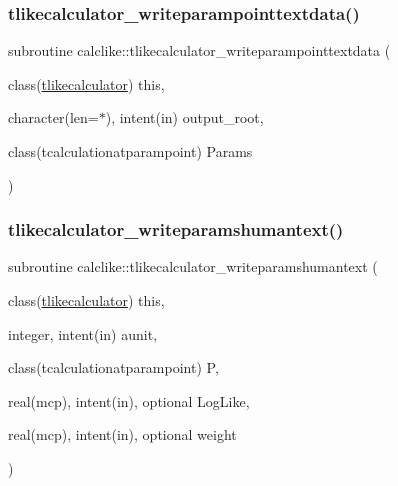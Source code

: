 \mbox{\label{namespacecalclike_a4be845214aaba0f4348b66c67401f78b}} 
\subsubsection{\texorpdfstring{tlikecalculator\+\_\+writeparampointtextdata()}{tlikecalculator\_writeparampointtextdata()}}
{\footnotesize\ttfamily subroutine calclike\+::tlikecalculator\+\_\+writeparampointtextdata (\begin{DoxyParamCaption}\item[{class(\mbox{\hyperlink{structcalclike_1_1tlikecalculator}{tlikecalculator}})}]{this,  }\item[{character(len=$\ast$), intent(in)}]{output\+\_\+root,  }\item[{class(tcalculationatparampoint)}]{Params }\end{DoxyParamCaption})\hspace{0.3cm}{\ttfamily [private]}}

\mbox{\label{namespacecalclike_a7348b373c8c9138f0c694ad9969fcb66}} 
\subsubsection{\texorpdfstring{tlikecalculator\+\_\+writeparamshumantext()}{tlikecalculator\_writeparamshumantext()}}
{\footnotesize\ttfamily subroutine calclike\+::tlikecalculator\+\_\+writeparamshumantext (\begin{DoxyParamCaption}\item[{class(\mbox{\hyperlink{structcalclike_1_1tlikecalculator}{tlikecalculator}})}]{this,  }\item[{integer, intent(in)}]{aunit,  }\item[{class(tcalculationatparampoint)}]{P,  }\item[{real(mcp), intent(in), optional}]{Log\+Like,  }\item[{real(mcp), intent(in), optional}]{weight }\end{DoxyParamCaption})\hspace{0.3cm}{\ttfamily [private]}}

